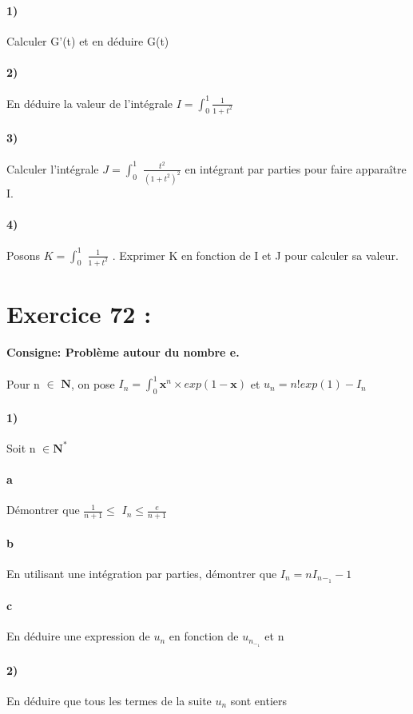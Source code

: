 \documentclass[a4paper]{report}
\begin{document}
\paragraph{1)}
Calculer G'(t) et en déduire G(t)
\paragraph{2)}En déduire la valeur de l'intégrale $I=\int_0^1 \frac{1}{1+t^2}$
\paragraph{3)} Calculer l'intégrale $J=\int_0^1$ $\frac{t^2}{(1+t^2)^2}$ en intégrant par parties pour faire apparaître I.

\paragraph{4)}
Posons $K=\int_0^1$ $\frac{1}{1+t^2}$ . Exprimer K en fonction de I et J pour calculer sa valeur.

\section{Exercice 72 :}
\paragraph{Consigne: Problème autour du nombre e.}
Pour n $\in$  $\mathbf{N}$, on pose $I_n=\int_0^1 \mathbf{x}^n\times exp(1-\mathbf{x})$ et $u_n=n!exp(1) -I_n$
\paragraph{1)}
Soit n $\in\mathbf{N}^*$
\paragraph{a}
Démontrer que $\frac{1}{n+1} \leq$ $I_n \leq \frac{e}{n+1}$
\paragraph{b}
En utilisant une intégration par parties, démontrer que $I_n=nI_n$$_-_1 -1$
\paragraph{c}
En déduire une expression de $u_n$ en fonction de $u_n_-_1$ et n
\paragraph{2)}
En déduire que tous les termes de la suite $u_n$ sont entiers
\end{document}
